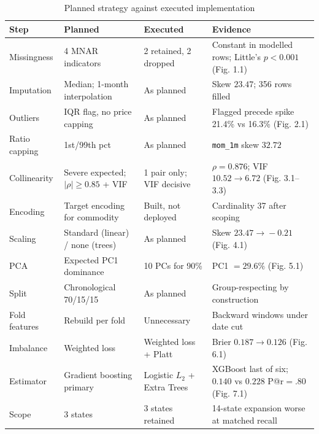 \documentclass[conference]{IEEEtran}
\begin{document}
\begin{table}[!t]
\caption{Planned strategy against executed implementation}
\begin{center}
\small
\begin{tabular}{@{}p{2.6cm}p{3.8cm}p{3.8cm}p{6.2cm}@{}}
\toprule
\textbf{Step} & \textbf{Planned} & \textbf{Executed} & \textbf{Evidence} \\
\midrule
Missingness
& 4 MNAR indicators
& 2 retained, 2 dropped
& Constant in modelled rows; Little's $p<0.001$ (Fig. 1.1) \\
\addlinespace
Imputation
& Median; 1-month interpolation
& As planned
& Skew $23.47$; 356 rows filled \\
\addlinespace
Outliers
& IQR flag, no price capping
& As planned
& Flagged precede spike 21.4\% vs 16.3\% (Fig. 2.1) \\
\addlinespace
Ratio capping
& 1st/99th pct
& As planned
& \texttt{mom\_1m} skew $32.72$ \\
\addlinespace
Collinearity
& Severe expected; $|\rho|\!\geq\!0.85$ + VIF
& 1 pair only; VIF decisive
& $\rho=0.876$; VIF $10.52\!\to\!6.72$ (Fig. 3.1--3.3) \\
\addlinespace
Encoding
& Target encoding for commodity
& Built, not deployed
& Cardinality 37 after scoping \\
\addlinespace
Scaling
& Standard (linear) / none (trees)
& As planned
& Skew $23.47\!\to\!-0.21$ (Fig. 4.1) \\
\addlinespace
PCA
& Expected PC1 dominance
& 10 PCs for 90\%
& PC1 $=29.6\%$ (Fig. 5.1) \\
\addlinespace
Split
& Chronological 70/15/15
& As planned
& Group-respecting by construction \\
\addlinespace
Fold features
& Rebuild per fold
& Unnecessary
& Backward windows under date cut \\
\addlinespace
Imbalance
& Weighted loss
& Weighted loss + Platt
& Brier $0.187\!\to\!0.126$ (Fig. 6.1) \\
\addlinespace
Estimator
& Gradient boosting primary
& Logistic $L_2$ + Extra Trees
& XGBoost last of six; $0.140$ vs $0.228$ P@r$=$.80 (Fig. 7.1) \\
\addlinespace
Scope
& 3 states
& 3 states retained
& 14-state expansion worse at matched recall \\
\bottomrule
\end{tabular}
\label{tab:decisionlog}
\end{center}
\end{table}
\end{document}

